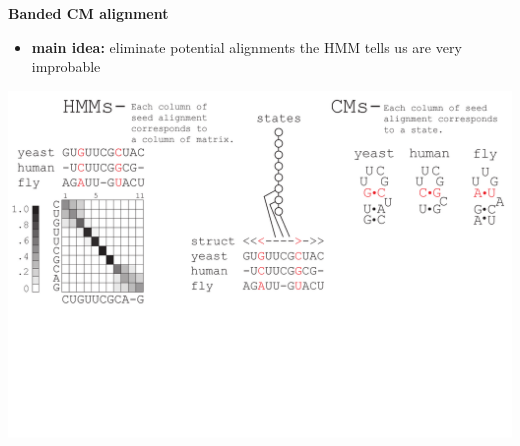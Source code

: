 \documentclass[landscape]{slides}
\begin{document}
\begin{slide}
\begin{center}
\large
\textbf{Banded CM alignment}
\end{center}
\medskip
\small
\begin{itemize}
\item
\textbf{main idea:} eliminate potential alignments the HMM tells us are very improbable
\end{itemize}
\begin{center}
\includegraphics[width=8in]{figs/post_hmm_to_cm_map2_layer5}
\end{center}
\vfill
\end{slide}
\end{document}
